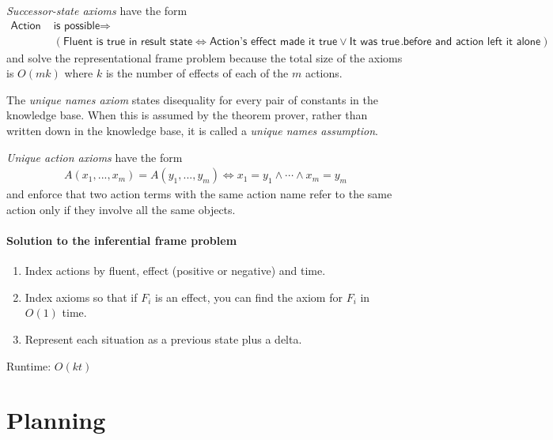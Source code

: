 \documentclass{article}
\begin{document}
\begin{theorem}[R\&N p. 267]
    \emph{Successor-state axioms} have the form
    \begin{align*}
        \textsf{Action } &\textsf{is possible} \Rightarrow\\
        &(\textsf{Fluent is true in result state} \Leftrightarrow
        \textsf{Action's effect made it true}\vee \textsf{It was true before
        and action left it alone}).
    \end{align*}
    and solve the representational
    frame problem because the total size of the axioms is $O(mk)$ where
    $k$ is the number of effects of each of the $m$ actions.
\end{theorem}

\begin{definition}
    The \emph{unique names axiom} states disequality for every pair of
    constants in the knowledge base. When this is assumed by the theorem
    prover, rather than written down in the knowledge base, it is called
    a \emph{unique names assumption}.
\end{definition}

\begin{definition}
    \emph{Unique action axioms} have the form
    \begin{align*}
        A(x_1,...,x_m)=A(y_1,...,y_m)\Leftrightarrow x_1 = y_1\wedge\cdots \wedge x_m=y_m
    \end{align*}
    and enforce that two action terms with the same action name refer to the
    same action only if they involve all the same objects.
\end{definition}

\paragraph{Solution to the inferential frame problem}

\begin{enumerate}
    \item Index actions by fluent, effect (positive or negative) and time.
    \item Index axioms so that if $F_i$ is an effect, you can find the axiom for $F_i$ in $O(1)$ time.
    \item Represent each situation as a previous state plus a delta.
\end{enumerate}
Runtime: $O(kt)$

\section{Planning}
\end{document}
